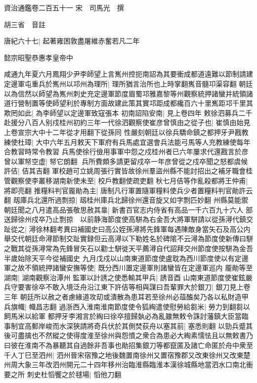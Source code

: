 資治通鑑卷二百五十一
宋　司馬光　撰

胡三省　音註

唐紀六十七|{
	起著雍困敦盡屠維赤奮若凡二年}


懿宗昭聖恭惠孝皇帝中

咸通九年夏六月鳳翔少尹李師望上言嶲州控扼南詔為其要衝成都道遠難以節制請建定邊軍屯重兵於嶲州以邛州為理所|{
	理所猶言治所也上時掌翻嶲音髓卭渠容翻}
朝廷以為信然以師望為嶲州刺史充定邊軍節度眉蜀邛雅嘉黎等州觀察統押諸蠻并統領諸道行營制置等使師望利於專制方面故建此策其實邛距成都纔百六十里嶲距邛千里其欺罔如此|{
	為李師望以定邊軍致寇張本}
初南詔陷安南|{
	見上卷四年}
敕徐泗募兵二千赴援分八百人别戍桂州初約三年一代徐泗觀察使崔彦曾慎由之從子也|{
	崔慎由始見上卷宣宗大中十二年從才用翻下從孫同}
性嚴刻朝廷以徐兵驕命鎮之都押牙尹戡教練使杜璋|{
	大中六年五月敕天下軍府有兵馬處宜選會兵法能弓馬等人充教練使每年合教習時常令教習}
兵馬使徐行儉用事軍中怨之戍桂州者已六年屢求代還戡言於彦曾以軍帑空虚|{
	帑它朗翻}
兵所費頗多請更留戍卒一年彦曾從之戍卒聞之怒都虞候許佶|{
	佶其吉翻}
軍校趙可立姚周張行實皆故徐州羣盜州縣不能討招出之補牙職會桂管觀察使李叢移湖南新使未至|{
	校戶教翻使疏吏翻}
秋七月佶等作亂殺都將王仲甫|{
	將即亮翻}
推糧料判官龎勛為主|{
	唐制凡行軍置隨軍糧料使兵少者置糧料判官勛許云翻}
刼庫兵北還所過剽掠|{
	刼桂州庫兵北歸徐州還音旋又如字剽匹妙翻}
州縣莫能禦朝廷聞之八月遣高品張敬思赦其辠|{
	新書百官志内侍省有高品一千六百九十六人}
部送歸徐州戍卒乃止剽掠　以前静海節度使高駢為右金吾大將軍駢請以從孫潯代鎮交趾從之|{
	潯徐林翻考異曰補國史曰高公姪孫潯將先鋒軍每遇陳敵身當矢石及高公内舉交代朝廷命潯節制交趾實録但云高潯以下勒姓名於碑隂不云潯為節度使新傳曰駢之戰其從孫潯常為先鋒冒矢石以勸士駢徙天平薦潯自代詔拜交州節度使按駢為金吾半歲始除天平今從補國史}
九月戊戍以山南東道節度使盧耽為西川節度使以有定邊軍之故不領統押諸蠻安撫等使|{
	既分西川置定邊軍則諸蠻皆在定邊軍巡内}
龎勛等至湖南|{
	湖南觀察治潭州}
監軍以計誘之使悉輸其甲兵|{
	誘音酉}
山南東道節度使崔鉉嚴兵守要害徐卒不敢入境泛舟沿江東下許佶等相與謀曰吾輩罪大於銀刀|{
	銀刀見上卷三年}
朝廷所以赦之者慮緣道攻刧或潰散為患耳若至徐州必葅醢矣乃各以私財造甲兵旗幟|{
	幟昌志翻}
過浙西入淮南淮南節度使令狐綯遣使慰勞給芻米|{
	勞力到翻芻以飼馬米以給軍}
都押牙李湘言於綯曰徐卒擅歸埶必為亂雖無敕令誅討藩鎮大臣當臨事制宜高郵岸峻而水深狹請將奇兵伏於其側焚荻舟以塞其前|{
	塞悉則翻}
以勁兵蹙其後可盡擒也不然縱之使得度淮至徐州與怨憤之衆合為患必大綯素懦怯且以無敕書乃曰彼在淮南不為暴聽其自過餘非吾事也勛招集銀刀等都竄匿及諸亡命匿於舟中衆至千人丁巳至泗州|{
	泗州晉宋宿豫之地後魏置南徐州又置宿豫郡又改東徐州又改東楚州周大象三年改泗州開元二十四年移州治臨淮縣臨淮本漢徐城縣地當泗水口南北衝要之所}
刺史杜慆饗之於毬場|{
	慆他刀翻}
